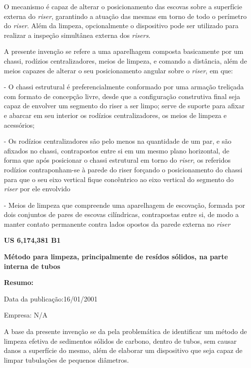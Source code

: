 \documentclass[a4paper,12pt]{article}
\begin{document}
O mecanismo é capaz de alterar o posicionamento das escovas
sobre a superfície externa do \textit{riser}, garantindo a atuação das mesmas em
torno de todo o perímetro do \textit{riser}. Além da limpeza, opcionalmente o dispositivo pode ser utilizado
para realizar a inspeção simultânea externa dos \textit{risers}.

 A presente invenção se refere a uma aparelhagem composta
basicamente por um chassi, rodízios centralizadores, meios de limpeza, e
comando a distância, além de meios capazes de alterar o seu
posicionamento angular sobre o \textit{riser}, em que:

- O chassi estrutural é preferencialmente conformado por uma
armação treliçada com formato de concepção livre, desde que a
configuração construtiva final seja capaz de envolver um segmento
do riser a ser limpo; serve de suporte para afixar e abarcar em seu
interior os rodízios centralizadores, os meios de limpeza e
acessórios; 

- Os rodízios centralizadores são pelo menos na quantidade de um
par, e são afixados no chassi, contrapostos entre si em um mesmo
plano horizontal, de forma que após posicionar o chassi estrutural
em torno do \textit{riser}, os referidos rodízios contraponham-se à parede
do riser forçando o posicionamento do chassi para que o seu eixo
vertical fique concêntrico ao eixo vertical do segmento do \textit{riser} por
ele envolvido

- Meios de limpeza que compreende uma aparelhagem de
escovação, formada por dois conjuntos de pares de escovas
cilíndricas, contrapostas entre si, de modo a manter contato
permanente contra lados opostos da parede externa no \textit{riser}


\vspace{1,0cm}
 \begin{center}
  \textbf{US 6,174,381 B1} 
 
 \textbf{Método para limpeza, principalmente de resídos sólidos, na parte interna de tubos}
 \end{center}
 
 \textbf{Resumo:}
 
 Data da publicação:16/01/2001
 
 Empresa: N/A
 
 \vspace{1,0cm}

 A base da presente invenção se da pela problemática de identificar um método de limpeza efetiva de sedimentos sólidos de carbono, dentro de tubos, sem causar danos a superfície do mesmo, além de elaborar um dispositivo que seja capaz de limpar tubulações de pequenos diâmetros.
 
\end{document}
